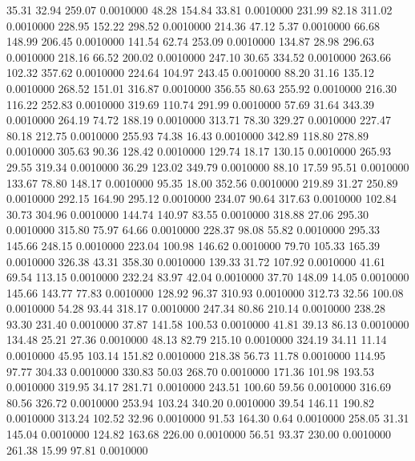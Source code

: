   35.31   32.94  259.07   0.0010000
  48.28  154.84   33.81   0.0010000
 231.99   82.18  311.02   0.0010000
 228.95  152.22  298.52   0.0010000
 214.36   47.12    5.37   0.0010000
  66.68  148.99  206.45   0.0010000
 141.54   62.74  253.09   0.0010000
 134.87   28.98  296.63   0.0010000
 218.16   66.52  200.02   0.0010000
 247.10   30.65  334.52   0.0010000
 263.66  102.32  357.62   0.0010000
 224.64  104.97  243.45   0.0010000
  88.20   31.16  135.12   0.0010000
 268.52  151.01  316.87   0.0010000
 356.55   80.63  255.92   0.0010000
 216.30  116.22  252.83   0.0010000
 319.69  110.74  291.99   0.0010000
  57.69   31.64  343.39   0.0010000
 264.19   74.72  188.19   0.0010000
 313.71   78.30  329.27   0.0010000
 227.47   80.18  212.75   0.0010000
 255.93   74.38   16.43   0.0010000
 342.89  118.80  278.89   0.0010000
 305.63   90.36  128.42   0.0010000
 129.74   18.17  130.15   0.0010000
 265.93   29.55  319.34   0.0010000
  36.29  123.02  349.79   0.0010000
  88.10   17.59   95.51   0.0010000
 133.67   78.80  148.17   0.0010000
  95.35   18.00  352.56   0.0010000
 219.89   31.27  250.89   0.0010000
 292.15  164.90  295.12   0.0010000
 234.07   90.64  317.63   0.0010000
 102.84   30.73  304.96   0.0010000
 144.74  140.97   83.55   0.0010000
 318.88   27.06  295.30   0.0010000
 315.80   75.97   64.66   0.0010000
 228.37   98.08   55.82   0.0010000
 295.33  145.66  248.15   0.0010000
 223.04  100.98  146.62   0.0010000
  79.70  105.33  165.39   0.0010000
 326.38   43.31  358.30   0.0010000
 139.33   31.72  107.92   0.0010000
  41.61   69.54  113.15   0.0010000
 232.24   83.97   42.04   0.0010000
  37.70  148.09   14.05   0.0010000
 145.66  143.77   77.83   0.0010000
 128.92   96.37  310.93   0.0010000
 312.73   32.56  100.08   0.0010000
  54.28   93.44  318.17   0.0010000
 247.34   80.86  210.14   0.0010000
 238.28   93.30  231.40   0.0010000
  37.87  141.58  100.53   0.0010000
  41.81   39.13   86.13   0.0010000
 134.48   25.21   27.36   0.0010000
  48.13   82.79  215.10   0.0010000
 324.19   34.11   11.14   0.0010000
  45.95  103.14  151.82   0.0010000
 218.38   56.73   11.78   0.0010000
 114.95   97.77  304.33   0.0010000
 330.83   50.03  268.70   0.0010000
 171.36  101.98  193.53   0.0010000
 319.95   34.17  281.71   0.0010000
 243.51  100.60   59.56   0.0010000
 316.69   80.56  326.72   0.0010000
 253.94  103.24  340.20   0.0010000
  39.54  146.11  190.82   0.0010000
 313.24  102.52   32.96   0.0010000
  91.53  164.30    0.64   0.0010000
 258.05   31.31  145.04   0.0010000
 124.82  163.68  226.00   0.0010000
  56.51   93.37  230.00   0.0010000
 261.38   15.99   97.81   0.0010000
